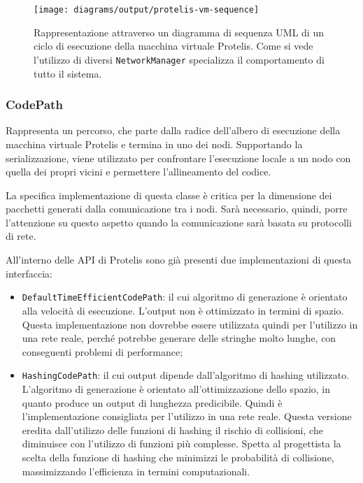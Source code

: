 \begin{figure}
  \centering
  \texttt{[image: diagrams/output/protelis-vm-sequence]}
  \caption{Rappresentazione attraverso un diagramma di sequenza UML di un ciclo
    di esecuzione della macchina virtuale Protelis. Come si vede l'utilizzo di
    diversi \texttt{NetworkManager} specializza il comportamento di tutto il
    sistema.}
    \label{fig:uml-protelisvm}
\end{figure}


\subsubsection{CodePath}
Rappresenta un percorso, che parte dalla radice dell'albero di esecuzione della
macchina virtuale Protelis e termina in uno dei nodi. Supportando la
serializzazione, viene utilizzato per confrontare l'esecuzione locale a un nodo
con quella dei propri vicini e permettere l'allineamento del codice.

La specifica implementazione di questa classe è critica per la dimensione dei
pacchetti generati dalla comunicazione tra i nodi. Sarà necessario, quindi,
porre l'attenzione su questo aspetto quando la comunicazione sarà basata su
protocolli di rete.

All'interno delle API di Protelis sono già presenti due implementazioni di
questa interfaccia:
\begin{itemize}
\item \texttt{DefaultTimeEfficientCodePath}: il cui algoritmo di generazione è
  orientato alla velocità di esecuzione. L'output non è ottimizzato in termini
  di spazio. Questa implementazione non dovrebbe essere utilizzata quindi per
  l'utilizzo in una rete reale, perché potrebbe generare delle stringhe molto
  lunghe, con conseguenti problemi di performance;
\item \texttt{HashingCodePath}: il cui output dipende dall'algoritmo di hashing
  utilizzato. L'algoritmo di generazione è orientato all'ottimizzazione dello
  spazio, in quanto produce un output di lunghezza predicibile. Quindi è
  l'implementazione consigliata per l'utilizzo in una rete reale. Questa
  versione eredita dall'utilizzo delle funzioni di hashing il rischio di
  collisioni, che diminuisce con l'utilizzo di funzioni più complesse. Spetta al
  progettista la scelta della funzione di hashing che minimizzi le probabilità
  di collisione, massimizzando l'efficienza in termini computazionali.
\end{itemize}

